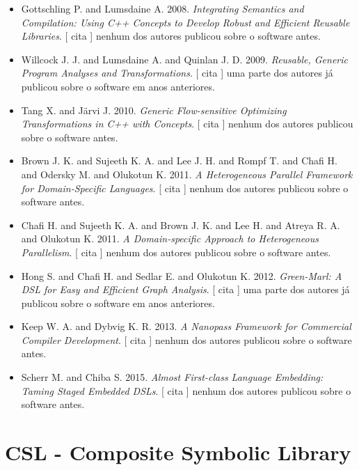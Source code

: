\begin{itemize}
      [
          cita
      ]
uma parte dos autores já publicou sobre o software em anos anteriores.
\item Gottschling P. and Lumsdaine A.
      2008.
        \textit{ Integrating Semantics and Compilation: Using C++ Concepts to Develop Robust and Efficient Reusable Libraries}.
      [
          cita
      ]
nenhum dos autores publicou sobre o software antes.
\item Willcock J. J. and Lumsdaine A. and Quinlan J. D.
      2009.
        \textit{ Reusable, Generic Program Analyses and Transformations}.
      [
          cita
      ]
uma parte dos autores já publicou sobre o software em anos anteriores.
\item Tang X. and J\"{a}rvi J.
      2010.
        \textit{ Generic Flow-sensitive Optimizing Transformations in C++ with Concepts}.
      [
          cita
      ]
nenhum dos autores publicou sobre o software antes.
\item Brown J. K. and Sujeeth K. A. and Lee J. H. and Rompf T. and Chafi H. and Odersky M. and Olukotun K.
      2011.
        \textit{ A Heterogeneous Parallel Framework for Domain-Specific Languages}.
      [
          cita
      ]
nenhum dos autores publicou sobre o software antes.
\item Chafi H. and Sujeeth K. A. and Brown J. K. and Lee H. and Atreya R. A. and Olukotun K.
      2011.
        \textit{ A Domain-specific Approach to Heterogeneous Parallelism}.
      [
          cita
      ]
nenhum dos autores publicou sobre o software antes.
\item Hong S. and Chafi H. and Sedlar E. and Olukotun K.
      2012.
        \textit{ Green-Marl: A DSL for Easy and Efficient Graph Analysis}.
      [
          cita
      ]
uma parte dos autores já publicou sobre o software em anos anteriores.
\item Keep W. A. and Dybvig K. R.
      2013.
        \textit{ A Nanopass Framework for Commercial Compiler Development}.
      [
          cita
      ]
nenhum dos autores publicou sobre o software antes.
\item Scherr M. and Chiba S.
      2015.
        \textit{ Almost First-class Language Embedding: Taming Staged Embedded DSLs}.
      [
          cita
      ]
nenhum dos autores publicou sobre o software antes.
\end{itemize}
\section{CSL - Composite Symbolic Library}

